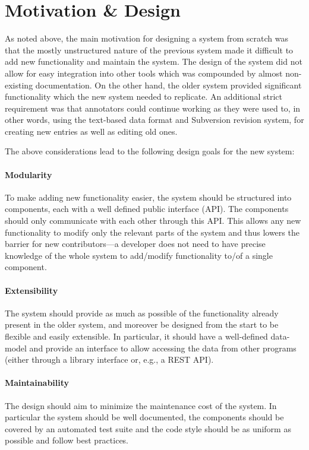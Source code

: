\documentclass[10pt, a4paper]{article}
\begin{document}
\section{Motivation \& Design}
As noted above, the main motivation for designing a system from scratch was that the mostly unstructured
nature of the previous system made it difficult to add new functionality and maintain the
system. The design of the system did not allow for easy integration into other tools which
was compounded by almost non-existing documentation. On the other hand, the older system
provided significant functionality which the new system needed to replicate. An additional
strict requirement was that annotators could continue working as they were used to,
in other words, using the text-based data format and Subversion revision system, for creating
new entries as well as editing old ones.

The above considerations lead to the following design goals for the new system:

\paragraph{Modularity} To make adding new functionality easier, the system should be structured
into components, each with a well defined public interface (API). The components should only communicate
with each other through this API. This allows any new functionality to modify only the
relevant parts of the system and thus lowers the barrier for new contributors---a developer does
not need to have precise knowledge of the whole system to add/modify functionality to/of a single component.

\paragraph{Extensibility}
The system should provide as much as possible of the functionality
already present in the older system, and moreover be designed from the start to be flexible and easily
extensible. In particular, it should have a well-defined data-model and provide an interface to allow
accessing the data from other programs (either through a library interface or, e.g., a REST API).

\paragraph{Maintainability} The design should aim to minimize the maintenance cost of the system.
In particular the system should be well documented, the components should be covered by an automated
test suite and the code style should be as uniform as possible and follow best practices.
\end{document}
